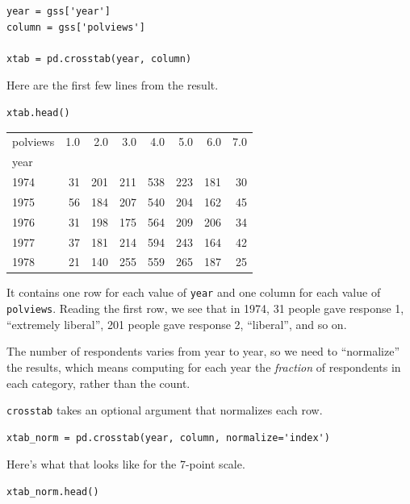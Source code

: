 \begin{lstlisting}[]
year = gss['year']
column = gss['polviews']

xtab = pd.crosstab(year, column)
\end{lstlisting}

Here are the first few lines from the result.

\begin{lstlisting}[]
xtab.head()
\end{lstlisting}

\begin{tabular}{lrrrrrrr}
\midrule
polviews &  1.0 &  2.0 &  3.0 &  4.0 &  5.0 &  6.0 &  7.0 \\
year &      &      &      &      &      &      &      \\
\midrule
1974 &   31 &  201 &  211 &  538 &  223 &  181 &   30 \\
1975 &   56 &  184 &  207 &  540 &  204 &  162 &   45 \\
1976 &   31 &  198 &  175 &  564 &  209 &  206 &   34 \\
1977 &   37 &  181 &  214 &  594 &  243 &  164 &   42 \\
1978 &   21 &  140 &  255 &  559 &  265 &  187 &   25 \\
\midrule
\end{tabular}

It contains one row for each value of \passthrough{\lstinline!year!} and
one column for each value of \passthrough{\lstinline!polviews!}. Reading
the first row, we see that in 1974, 31 people gave response 1,
``extremely liberal'', 201 people gave response 2, ``liberal'', and so
on.

The number of respondents varies from year to year, so we need to
``normalize'' the results, which means computing for each year the
\emph{fraction} of respondents in each category, rather than the count.

\passthrough{\lstinline!crosstab!} takes an optional argument that
normalizes each row.

\begin{lstlisting}[]
xtab_norm = pd.crosstab(year, column, normalize='index')
\end{lstlisting}

Here's what that looks like for the 7-point scale.

\begin{lstlisting}[]
xtab_norm.head()
\end{lstlisting}

